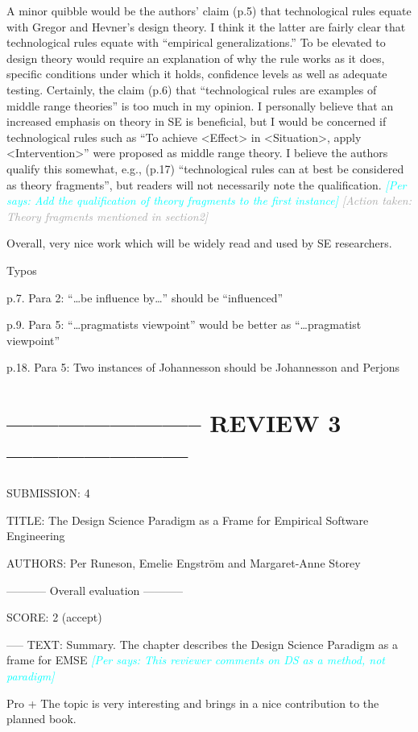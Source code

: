 \documentclass{article}
\newcommand{\per}[1]{\textcolor{cyan}{{\it [Per says: #1]}}}
\newcommand{\action}[1]{\textcolor{darkgray}{{\it [Action taken: #1]}}}
\newcommand{\per}[1]{}
\newcommand{\action}[1]{}
\begin{document}
A minor quibble would be the authors’ claim (p.5) that technological rules equate with Gregor and Hevner’s design theory.  I think it the latter are fairly clear that technological rules equate with “empirical generalizations.”  To be elevated to design theory would require an explanation of why the rule works as it does, specific conditions under which it holds, confidence levels as well as adequate testing. Certainly, the claim (p.6) that “technological rules are examples of middle range theories” is too much in my opinion. I personally believe that an increased emphasis on theory in SE is beneficial, but I would be concerned if technological rules such as “To achieve <Effect> in <Situation>, apply <Intervention>” were proposed as middle range theory. I believe the authors qualify this somewhat, e.g., (p.17) “technological rules can at best be considered as theory fragments”, but readers will not necessarily note the qualification. \per{Add the qualification of theory \emph{fragments} to the first instance} \action{Theory fragments mentioned in section2}
 
Overall, very nice work which will be widely read and used by SE researchers.
 

Typos
 
p.7. Para 2: “…be influence by…” should be “influenced”
 
p.9. Para 5: “…pragmatists viewpoint” would be better as “…pragmatist viewpoint”
 
p.18. Para 5: Two instances of Johannesson should be Johannesson and Perjons



\section*{----------------------- REVIEW 3 ---------------------}
SUBMISSION: 4

TITLE: The Design Science Paradigm as a Frame for Empirical Software Engineering

AUTHORS: Per Runeson, Emelie Engström and Margaret-Anne Storey

----------- Overall evaluation -----------

SCORE: 2 (accept)

----- TEXT:
Summary. The chapter describes the Design Science Paradigm as a frame for EMSE 
\per{This reviewer comments on DS as a method, not paradigm}

Pro
+ The topic is very interesting and brings in a nice contribution to the planned book.
\end{document}
